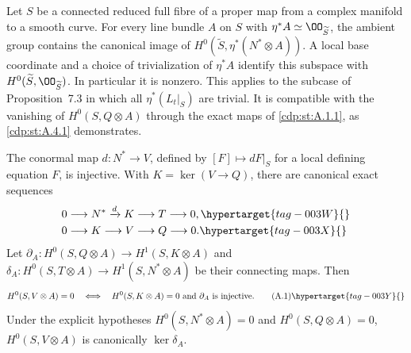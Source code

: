
\begin{proposition}\hypertarget{tag-01AZ}{}\label{cdp:st:A.5.1}


Let $S$ be a connected reduced full fibre of a proper map from a complex manifold to a smooth curve. For every line bundle $A$ on $S$ with $\eta^*A\simeq\OO_{\widetilde S}$, the ambient group contains the canonical image of $H^0(\widetilde S,\eta^*(N^*\otimes A))$. A local base coordinate and a choice of trivialization of $\eta^*A$ identify this subspace with $H^0(\widetilde S,\OO_{\widetilde S})$. In particular it is nonzero. This applies to the subcase of Proposition~7.3 in which all $\eta^*(L_t|_S)$ are trivial. It is compatible with the vanishing of $H^0(S,Q\otimes A)$ through the exact maps of \ref{cdp:st:A.1.1}, as \ref{cdp:st:A.4.1} demonstrates.
\end{proposition}

\begin{proposition}\hypertarget{tag-01AD}{}\label{cdp:st:A.1.1}

\label{wbII:prop:criterion}\label{wbII:prop:filtration}\label{wbII:lem:conormal}\label{wbII:lem:conormal-injective}\label{wbII:prop:missing-global-section-criterion}\label{wbII:prop:missing-cotangent-filtration}
The conormal map $d:N^*\to V$, defined by $[F]\mapsto dF|_S$ for a local defining equation $F$, is injective. With $K=\ker(V\to Q)$, there are canonical exact sequences
\begin{align}
0&\longrightarrow N^*\xrightarrow{d}K\longrightarrow T\longrightarrow0,
\hypertarget{tag-003W}{}\label{cdp:A:filtration1}\\
0&\longrightarrow K\longrightarrow V\longrightarrow Q\longrightarrow0.
\hypertarget{tag-003X}{}\label{cdp:A:filtration2}
\end{align}
Let $\partial_A:H^0(S,Q\otimes A)\to H^1(S,K\otimes A)$ and $\delta_A:H^0(S,T\otimes A)\to H^1(S,N^*\otimes A)$ be their connecting maps. Then
\[
 H^0(S,V\otimes A)=0
 \quad\Longleftrightarrow\quad
 H^0(S,K\otimes A)=0\ \hbox{and}\ \partial_A\hbox{ is injective}.
\tag{A.1}\hypertarget{tag-003Y}{}\label{cdp:eq:A.1}
\]
Under the explicit hypotheses $H^0(S,N^*\otimes A)=0$ and $H^0(S,Q\otimes A)=0$, $H^0(S,V\otimes A)$ is canonically $\ker\delta_A$.
\end{proposition}

